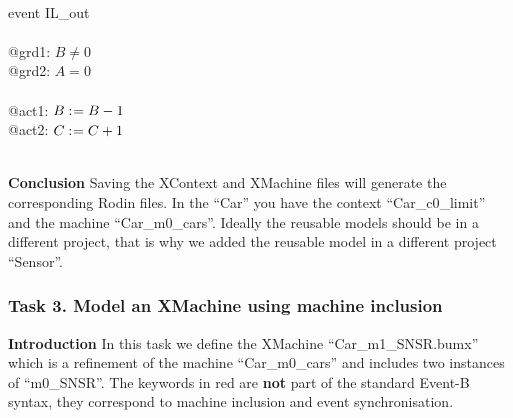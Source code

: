 \begin{description}
\begin{center}
\begin{Bcode}
			\Btab \Bend\\
			\Btab event IL_out\\
			\Btab \Bwhere\\
			\Btab \Btab @grd1: \(B \neq 0\)\\
			\Btab \Btab @grd2: \(A = 0\)\\
			\Btab \Bthen\\
			\Btab \Btab @act1: \(B \mathrel{:\mkern1mu=} B - 1\)\\
			\Btab \Btab @act2: \(C \mathrel{:\mkern1mu=} C + 1\)\\
			\Btab \Bend\\
			\Bend
			\fi
		\end{Bcode}
	\end{center}
	
\end{description}
\textbf{Conclusion} Saving the XContext and XMachine files will generate the corresponding Rodin files. In the ``Car'' you have the context ``Car\_c0\_limit'' and the machine ``Car\_m0\_cars''. Ideally the reusable models should be in a different project, that is why we added the reusable model in a different project ``Sensor''.

\subsubsection{Task 3. Model an XMachine using machine inclusion}
\textbf{Introduction} In this task we define the XMachine ``Car\_m1\_SNSR.bumx'' which is a refinement of the machine ``Car\_m0\_cars'' and includes two instances of ``m0\_SNSR''. The keywords in red  are \textbf{not} part of the standard Event-B syntax, they correspond to machine inclusion and event synchronisation. 

